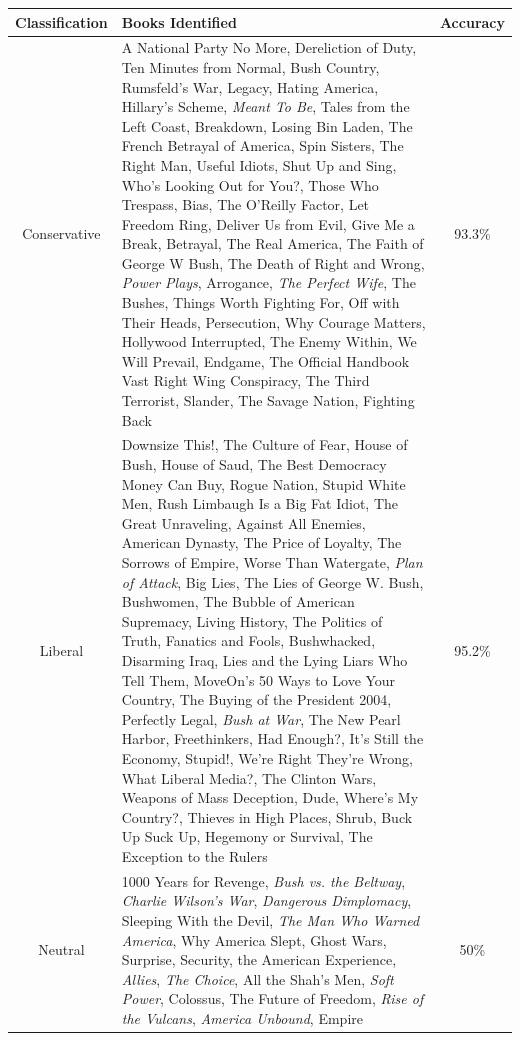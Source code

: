 \documentclass{article}\usepackage[]{graphicx}\usepackage[]{color}
\begin{document}
\begin{table}[H]
\centering
\begin{tabular}{cp{10cm}c}
  \hline
Classification & Books Identified & Accuracy \\ 
  \hline
Conservative & A National Party No More, Dereliction of Duty, Ten Minutes from Normal, Bush Country, Rumsfeld's War, Legacy, Hating America, Hillary's Scheme, {\it Meant To Be}, Tales from the Left Coast, Breakdown, Losing Bin Laden, The French Betrayal of America, Spin Sisters, The Right Man, Useful Idiots, Shut Up and Sing, Who's Looking Out for You?, Those Who Trespass, Bias, The O'Reilly Factor, Let Freedom Ring, Deliver Us from Evil, Give Me a Break, Betrayal, The Real America, The Faith of George W Bush, The Death of Right and Wrong, {\it Power Plays}, Arrogance, {\it The Perfect Wife}, The Bushes, Things Worth Fighting For, Off with Their Heads, Persecution, Why Courage Matters, Hollywood Interrupted, The Enemy Within, We Will Prevail, Endgame, The Official Handbook Vast Right Wing Conspiracy, The Third Terrorist, Slander, The Savage Nation, Fighting Back & 93.3\% \\ 
  Liberal & Downsize This!, The Culture of Fear, House of Bush, House of Saud, The Best Democracy Money Can Buy, Rogue Nation, Stupid White Men, Rush Limbaugh Is a Big Fat Idiot, The Great Unraveling, Against All Enemies, American Dynasty, The Price of Loyalty, The Sorrows of Empire, Worse Than Watergate, {\it Plan of Attack}, Big Lies, The Lies of George W. Bush, Bushwomen, The Bubble of American Supremacy, Living History, The Politics of Truth, Fanatics and Fools, Bushwhacked, Disarming Iraq, Lies and the Lying Liars Who Tell Them, MoveOn's 50 Ways to Love Your Country, The Buying of the President 2004, Perfectly Legal, {\it Bush at War}, The New Pearl Harbor, Freethinkers, Had Enough?, It's Still the Economy, Stupid!, We're Right They're Wrong, What Liberal Media?, The Clinton Wars, Weapons of Mass Deception, Dude, Where's My Country?, Thieves in High Places, Shrub, Buck Up Suck Up, Hegemony or Survival, The Exception to the Rulers & 95.2\% \\ 
  Neutral & 1000 Years for Revenge, {\it Bush vs. the Beltway}, {\it Charlie Wilson's War}, {\it Dangerous Dimplomacy}, Sleeping With the Devil, {\it The Man Who Warned America}, Why America Slept, Ghost Wars, Surprise, Security, the American Experience, {\it Allies}, {\it The Choice}, All the Shah's Men, {\it Soft Power}, Colossus, The Future of Freedom, {\it Rise of the Vulcans}, {\it America Unbound}, Empire & 50\% \\ 
   \hline
\end{tabular}
\label{tab:polbooks_final}
\end{table}
\end{document}
